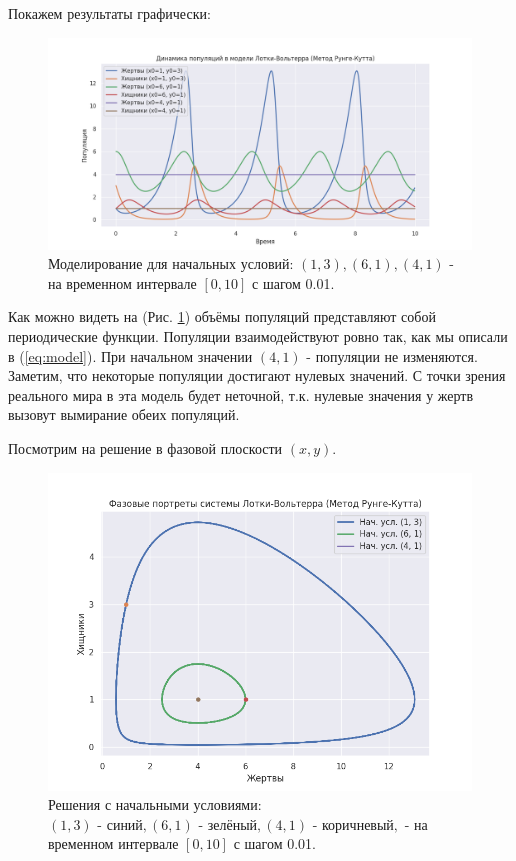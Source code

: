 Покажем результаты графически:
\begin{figure}[h]  %
	\centering
	\includegraphics[width=1\textwidth]{imgs/pop_1.png}  %
	\caption{Моделирование для начальных условий: $(1,3), (6,1),(4,1)$ - на временном интервале $[0,10]$ с шагом 0.01.}  %
	\label{fig:pop_1}  %
\end{figure}

Как можно видеть на (Рис. \ref{fig:pop_1}) объёмы популяций представляют собой периодические функции. Популяции взаимодействуют ровно так, как мы описали в (\ref{eq:model}). При начальном значении $(4,1)$ - популяции не изменяются.
Заметим, что некоторые популяции достигают нулевых значений. С точки зрения реального мира в эта модель будет неточной, т.к. нулевые значения у жертв вызовут вымирание обеих популяций.

Посмотрим на решение в фазовой плоскости $(x,y)$.
\begin{figure}[h]  %
	\centering
	\includegraphics[width=1\textwidth]{imgs/phase_1.png}  %
	\caption{Решения с начальными условиями: $(1,3)\text{ - синий}, (6,1)\text{ - зелёный}, (4,1)\text{ - коричневый}, $ - на временном интервале $[0,10]$ с шагом 0.01.}  %
	\label{fig:phase_1}  %
\end{figure}

